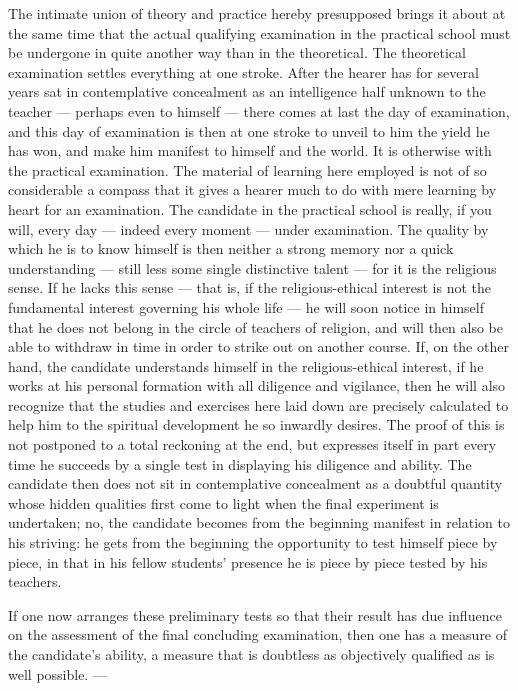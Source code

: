 \documentclass[12pt,a4paper]{book}
\begin{document}
The intimate union of theory and practice hereby presupposed brings it about at the same time that the
actual qualifying examination in the practical school must be undergone in quite another way than in the
theoretical. The theoretical examination settles everything at one stroke. After the hearer has for
several years sat in contemplative concealment as an intelligence half unknown to the teacher --- perhaps
even to himself --- there comes at last the day of examination, and this day of examination is then at one
stroke to unveil to him the yield he has won, and make him manifest to himself and the world. It is
otherwise with the practical examination. The material of learning here employed is not of so considerable
a compass that it gives a hearer much to do with mere learning by heart for an examination. The candidate
in the practical school is really, if you will, every day --- indeed every moment --- under examination.
The quality by which he is to know himself is then neither a strong memory nor a quick understanding ---
still less some single distinctive talent --- for it is the religious sense.
If he lacks this sense --- that is, if the religious-ethical interest is not the fundamental interest
governing his whole life --- he will soon notice in himself that he does not belong in the circle of
teachers of religion, and will then also be able to withdraw in time in order to strike out on another
course. If, on the other hand, the candidate understands himself in the religious-ethical interest, if he
works at his personal formation with all diligence and vigilance, then he will also recognize that the
studies and exercises here laid down are precisely calculated to help him to the spiritual development he
so inwardly desires. The proof of this is not postponed to a total reckoning at the end, but expresses
itself in part every time he succeeds by a single test in displaying his diligence and ability. The
candidate then does not sit in contemplative concealment as a doubtful quantity whose hidden qualities
first come to light when the final experiment is undertaken; no, the candidate becomes from the beginning
manifest in relation to his striving: he gets from the beginning the opportunity to test himself piece by
piece, in that in his fellow students' presence he is piece by piece tested by his teachers.

If one now arranges these preliminary tests so that their result has due influence on the assessment of
the final concluding examination, then one has a measure of the candidate's ability, a measure that is
doubtless as objectively qualified as is well possible. ---
\end{document}
